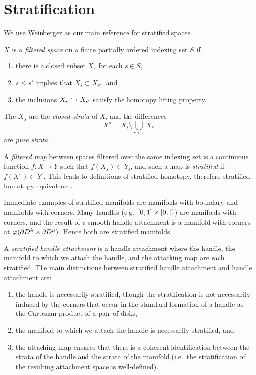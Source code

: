 \section{Stratification}
\label{section:problem-stratification}

We use Weinberger \cite{wein94} as our main reference for stratified spaces.

\begin{defn}[Stratification]
	$X$ is a \emph{filtered space} on a finite partially ordered indexing set $S$ if 
	\begin{enumerate}
		\item there is a closed subset $X_s$ for each $s\in S$,
		\item $s\leq s'$ implies that $X_s\subset X_{s'}$, and
		\item the inclusions $X_s \hookrightarrow X_{s'}$ satisfy the homotopy lifting property.
	\end{enumerate}
	The $X_s$ are the \emph{closed strata} of $X$, and the differences
	$$X^s = X_s\setminus \bigcup_{r < s} X_r$$
	are \emph{pure strata}.
	
	
	A \emph{filtered map} between spaces filtered over the same indexing set is a continuous function $f:X\to Y$ such that $f(X_s)\subset Y_s$, and such a map is \emph{stratified} if $f(X^s) \subset Y^s$.
	This leads to definitions of stratified homotopy, therefore stratified homotopy equivalence.
\end{defn}

Immediate examples of stratified manifolds are manifolds with boundary and manifolds with corners.
Many handles (e.g.\ $[0,1]\times[0,1]$) are manifolds with corners, and the result of a smooth handle attachment is a manifold with corners at $\varphi(\partial D^\lambda \times \partial D^\mu)$.
Hence both are stratified manifolds.

A \emph{stratified handle attachment} is a handle attachment where the handle, the manifold to which we attach the handle, and the attaching map are each stratified.
The main distinctions between stratified handle attachment and handle attachment are:
\begin{enumerate}
	\item the handle is necessarily stratified, though the stratification is not necessarily induced by the corners that occur in the standard formation of a handle as the Cartesian product of a pair of disks,
	
	\item the manifold to which we attach the handle is necessarily stratified, and
	
	\item the attaching map ensures that there is a coherent identification between the strata of the handle and the strata of the manifold (i.e.\ the stratification of the resulting attachment space is well-defined).
\end{enumerate}
